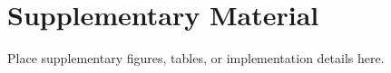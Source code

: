\chapter{Supplementary Material}

Place supplementary figures, tables, or implementation details here.
